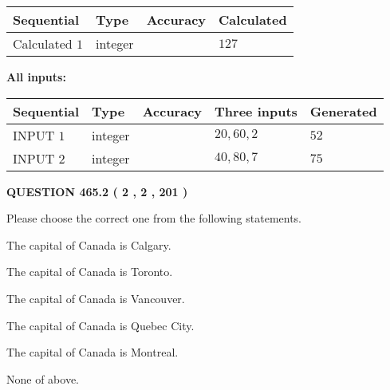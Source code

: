 \documentclass[12pt]{article}
\begin{document}
   
\noindent{}
   
   
  
  
\noindent\begin{tabular}{|l|l|l|l|}
\hline
 Sequential & Type & Accuracy & Calculated \\ 
\hline
 
 
  Calculated $  1 $ & integer &  & 
  $ 127 $ 
 \\  \hline  
 \end{tabular}
   
   
   
   
\noindent\vspace{0.1in}\hspace{-0.08in} {\textbf{\Large{All inputs: }}}
   
   
  
  
\noindent\begin{tabular}{|l|l|l|l|l|}
\hline
 Sequential & Type & Accuracy & Three inputs & Generated \\ 
\hline
 
 
  INPUT $  1 $ & integer &  & $
 20
 , 
 60
 , 
 2
 $ & $ 52 $ 
 \\  \hline  
 
 
  INPUT $  2 $ & integer &  & $
 40
 , 
 80
 , 
 7
 $ & $ 75 $ 
 \\  \hline  
 \end{tabular}
   
   
  
\vspace{0.2in}
  
{\textbf{\Large{QUESTION
465.2 
 ( 2 , 2 , 201 )
}}}
  
  
Please choose the correct one from the following statements.
 
 
The capital of Canada is Calgary.
 
 
The capital of Canada is Toronto.
 
 
The capital of Canada is Vancouver.
 
 
The capital of Canada is Quebec City.
 
 
The capital of Canada is Montreal.
 
 
 None of above.
 
 
\noindent{}
 
\end{document}
